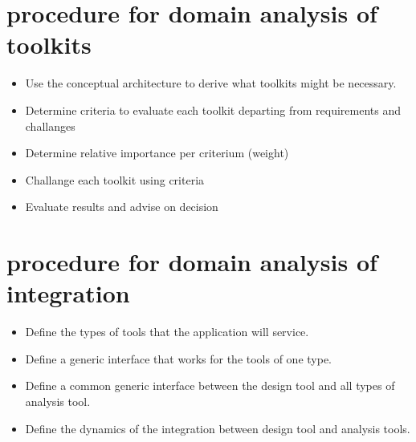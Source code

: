 \section{procedure for domain analysis of toolkits}
\begin{itemize}
    \item Use the conceptual architecture to derive what toolkits might be necessary.
    \item Determine criteria to evaluate each toolkit departing from requirements and challanges
    \item Determine relative importance per criterium (weight)
    \item Challange each toolkit using criteria
    \item Evaluate results and advise on decision
\end{itemize}
\section{procedure for domain analysis of integration}
\begin{itemize}
    \item Define the types of tools that the application will service.
    \item Define a generic interface that works for the tools of one type.
    \item Define a common generic interface between the design tool and all types of analysis tool.
    \item Define the dynamics of the integration between design tool and analysis tools.
\end{itemize}
